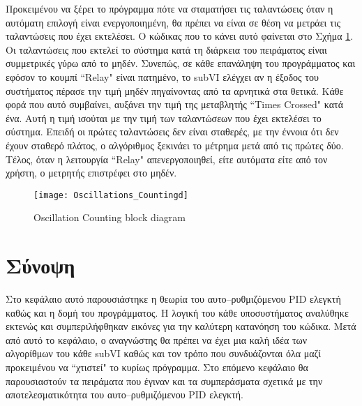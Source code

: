 Προκειμένου να ξέρει το πρόγραμμα πότε να σταματήσει τις ταλαντώσεις όταν η αυτόματη επιλογή είναι ενεργοποιημένη, θα πρέπει να είναι σε θέση να μετράει τις ταλαντώσεις που έχει εκτελέσει. Ο κώδικας που το κάνει αυτό φαίνεται στο Σχήμα \ref{fig:Oscillations_Countingd}. Οι ταλαντώσεις που εκτελεί το σύστημα κατά τη διάρκεια του πειράματος είναι συμμετρικές γύρω από το μηδέν. Συνεπώς, σε κάθε επανάληψη του προγράμματος και εφόσον το κουμπί ``Relay" είναι πατημένο, το subVI ελέγχει αν η έξοδος του συστήματος πέρασε την τιμή μηδέν πηγαίνοντας από τα αρνητικά στα θετικά. Κάθε φορά που αυτό συμβαίνει, αυξάνει την τιμή της μεταβλητής ``Times Crossed" κατά ένα. Αυτή η τιμή ισούται με την τιμή των ταλαντώσεων που έχει εκτελέσει το σύστημα. Επειδή οι πρώτες ταλαντώσεις δεν είναι σταθερές, με την έννοια ότι δεν έχουν σταθερό πλάτος, ο αλγόριθμος ξεκινάει το μέτρημα μετά από τις πρώτες δύο. Τέλος, όταν η λειτουργία ``Relay" απενεργοποιηθεί, είτε αυτόματα είτε από τον χρήστη, ο μετρητής επιστρέφει στο μηδέν.

\begin{figure}[h]
  \centering
  \texttt{[image: Oscillations\_Countingd]}
  \caption{Oscillation Counting block diagram}
  \label{fig:Oscillations_Countingd}
\end{figure}

\section{Σύνοψη}

Στο κεφάλαιο αυτό παρουσιάστηκε η θεωρία του αυτο--ρυθμιζόμενου PID ελεγκτή καθώς και η δομή του προγράμματος. Η λογική του κάθε υποσυστήματος αναλύθηκε εκτενώς και συμπεριλήφθηκαν εικόνες για την καλύτερη κατανόηση του κώδικα. Μετά από αυτό το κεφάλαιο, ο αναγνώστης θα πρέπει να έχει μια καλή ιδέα των αλγορίθμων του κάθε subVI καθώς και τον τρόπο που συνδυάζονται όλα μαζί προκειμένου να ``χτιστεί" το κυρίως πρόγραμμα. Στο επόμενο κεφάλαιο θα παρουσιαστούν τα πειράματα που έγιναν και τα συμπεράσματα σχετικά με την αποτελεσματικότητα του αυτο--ρυθμιζόμενου PID ελεγκτή.
